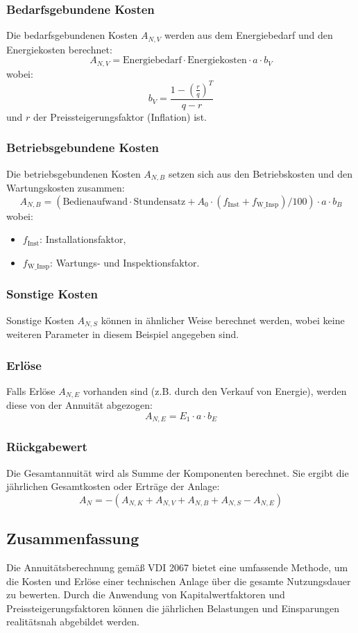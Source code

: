 \subsubsection{Bedarfsgebundene Kosten}
Die bedarfsgebundenen Kosten \(A_{N,V}\) werden aus dem Energiebedarf und den Energiekosten berechnet:
\[
A_{N,V} = \text{Energiebedarf} \cdot \text{Energiekosten} \cdot a \cdot b_V
\]
wobei:
\[
b_V = \frac{1 - \left(\frac{r}{q}\right)^T}{q - r}
\]
und \(r\) der Preissteigerungsfaktor (Inflation) ist.

\subsubsection{Betriebsgebundene Kosten}
Die betriebsgebundenen Kosten \(A_{N,B}\) setzen sich aus den Betriebskosten und den Wartungskosten zusammen:
\[
A_{N,B} = (\text{Bedienaufwand} \cdot \text{Stundensatz} + A_0 \cdot (f_\text{Inst} + f_\text{W\_Insp}) / 100) \cdot a \cdot b_B
\]
wobei:
\begin{itemize}
    \item \(f_\text{Inst}\): Installationsfaktor,
    \item \(f_\text{W\_Insp}\): Wartungs- und Inspektionsfaktor.
\end{itemize}

\subsubsection{Sonstige Kosten}
Sonstige Kosten \(A_{N,S}\) können in ähnlicher Weise berechnet werden, wobei keine weiteren Parameter in diesem Beispiel angegeben sind.

\subsubsection{Erlöse}
Falls Erlöse \(A_{N,E}\) vorhanden sind (z.B. durch den Verkauf von Energie), werden diese von der Annuität abgezogen:
\[
A_{N,E} = E_1 \cdot a \cdot b_E
\]

\subsubsection{Rückgabewert}
Die Gesamtannuität wird als Summe der Komponenten berechnet. Sie ergibt die jährlichen Gesamtkosten oder Erträge der Anlage:
\[
A_N = - (A_{N,K} + A_{N,V} + A_{N,B} + A_{N,S} - A_{N,E})
\]

\subsection{Zusammenfassung}
Die Annuitätsberechnung gemäß VDI 2067 bietet eine umfassende Methode, um die Kosten und Erlöse einer technischen Anlage über die gesamte Nutzungsdauer zu bewerten. Durch die Anwendung von Kapitalwertfaktoren und Preissteigerungsfaktoren können die jährlichen Belastungen und Einsparungen realitätsnah abgebildet werden.
